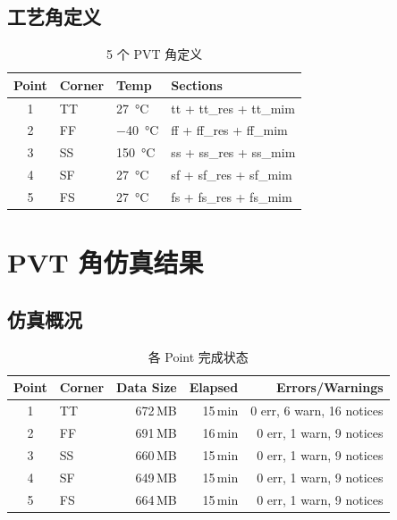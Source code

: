 \documentclass[journal]{IEEEtran}
\begin{document}
\subsection{工艺角定义}
\begin{table}[!t]
\centering
\caption{5 个 PVT 角定义}
\label{tab:pvt_defs}
\renewcommand{\arraystretch}{1.2}
\begin{tabular}{clll}
\toprule
\textbf{Point} & \textbf{Corner} & \textbf{Temp} & \textbf{Sections} \\
\midrule
1 & TT & \SI{27}{\celsius} & tt + tt\_res + tt\_mim \\
2 & FF & \SI{-40}{\celsius} & ff + ff\_res + ff\_mim \\
3 & SS & \SI{150}{\celsius} & ss + ss\_res + ss\_mim \\
4 & SF & \SI{27}{\celsius} & sf + sf\_res + sf\_mim \\
5 & FS & \SI{27}{\celsius} & fs + fs\_res + fs\_mim \\
\bottomrule
\end{tabular}
\end{table}

\section{PVT 角仿真结果}
\label{sec:pvt_results}

\subsection{仿真概况}
\begin{table}[!t]
\centering
\caption{各 Point 完成状态}
\label{tab:completion}
\renewcommand{\arraystretch}{1.2}
\begin{tabular}{clrrr}
\toprule
\textbf{Point} & \textbf{Corner} & \textbf{Data Size} & \textbf{Elapsed} & \textbf{Errors/Warnings} \\
\midrule
1 & TT & 672\,MB & 15\,min & 0 err, 6 warn, 16 notices \\
2 & FF & 691\,MB & 16\,min & 0 err, 1 warn, 9 notices \\
3 & SS & 660\,MB & 15\,min & 0 err, 1 warn, 9 notices \\
4 & SF & 649\,MB & 15\,min & 0 err, 1 warn, 9 notices \\
5 & FS & 664\,MB & 15\,min & 0 err, 1 warn, 9 notices \\
\bottomrule
\end{tabular}
\end{table}
\end{document}
